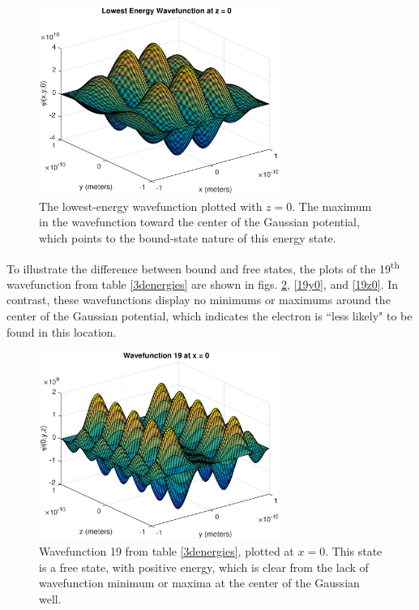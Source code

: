 \documentclass[12pt]{article}
\begin{document}
\begin{figure}
\begin{center}
\includegraphics[width=0.7\textwidth]{./pics/lowest3dz0.eps}
\end{center}
\caption{\label{lowestz0}The lowest-energy wavefunction plotted with $z=0$.  The maximum in the wavefunction toward the center of the Gaussian potential, which points to the bound-state nature of this energy state.}
\end{figure}

To illustrate the difference between bound and free states, the plots of the 19\textsuperscript{th} wavefunction from table \ref{3denergies} are shown in figs. \ref{19x0}, \ref{19y0}, and \ref{19z0}.  In contrast, these wavefunctions display no minimums or maximums around the center of the Gaussian potential, which indicates the electron is ``less likely" to be found in this location.

\begin{figure}
\begin{center}
\includegraphics[width=0.7\textwidth]{./pics/wfn19x0.eps}
\end{center}
\caption{\label{19x0}Wavefunction 19 from table \ref{3denergies}, plotted at $x=0$.  This state is a free state, with positive energy, which is clear from the lack of wavefunction minimum or maxima at the center of the Gaussian well.}
\end{figure}
\end{document}
